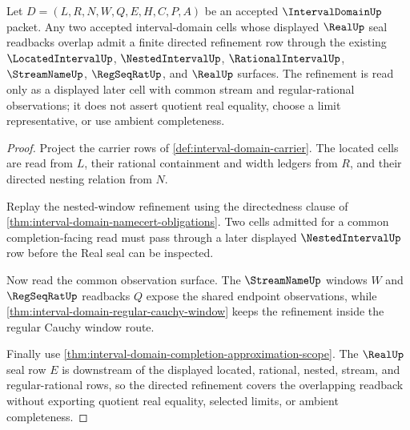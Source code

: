 \begin{theorem}
\label{thm:interval-domain-directed-refinement-covers}
Let $D=(L,R,N,W,Q,E,H,C,P,A)$ be an accepted $\IntervalDomainUp$ packet. Any two accepted interval-domain cells whose displayed $\RealUp$ seal readbacks overlap admit a finite directed refinement row through the existing $\LocatedIntervalUp$, $\NestedIntervalUp$, $\RationalIntervalUp$, $\StreamNameUp$, $\RegSeqRatUp$, and $\RealUp$ surfaces. The refinement is read only as a displayed later cell with common stream and regular-rational observations; it does not assert quotient real equality, choose a limit representative, or use ambient completeness.
\end{theorem}
\begin{proof}
Project the carrier rows of \autoref{def:interval-domain-carrier}. The located cells are read from $L$, their rational containment and width ledgers from $R$, and their directed nesting relation from $N$.

Replay the nested-window refinement using the directedness clause of \autoref{thm:interval-domain-namecert-obligations}. Two cells admitted for a common completion-facing read must pass through a later displayed $\NestedIntervalUp$ row before the Real seal can be inspected.

Now read the common observation surface. The $\StreamNameUp$ windows $W$ and $\RegSeqRatUp$ readbacks $Q$ expose the shared endpoint observations, while \autoref{thm:interval-domain-regular-cauchy-window} keeps the refinement inside the regular Cauchy window route.

Finally use \autoref{thm:interval-domain-completion-approximation-scope}. The $\RealUp$ seal row $E$ is downstream of the displayed located, rational, nested, stream, and regular-rational rows, so the directed refinement covers the overlapping readback without exporting quotient real equality, selected limits, or ambient completeness.
\end{proof}

